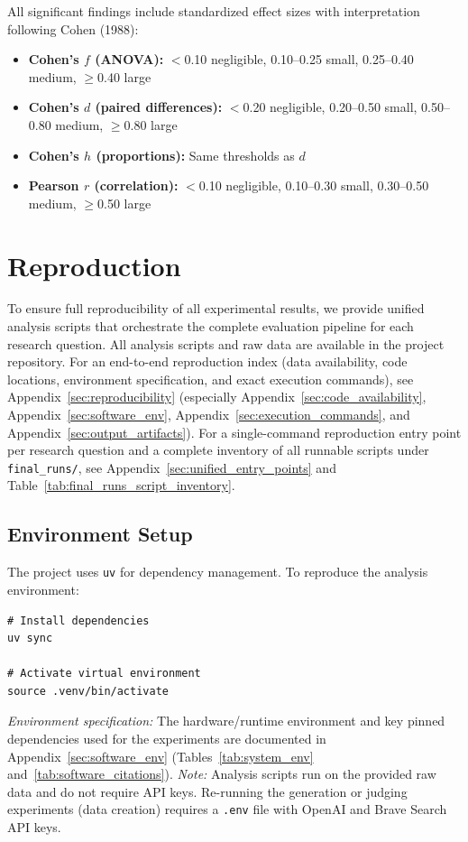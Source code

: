 All significant findings include standardized effect sizes with interpretation following Cohen (1988):
\begin{itemize}[noitemsep]
    \item \textbf{Cohen's $f$ (ANOVA):} $<$0.10 negligible, 0.10--0.25 small, 0.25--0.40 medium, $\geq$0.40 large
    \item \textbf{Cohen's $d$ (paired differences):} $<$0.20 negligible, 0.20--0.50 small, 0.50--0.80 medium, $\geq$0.80 large
    \item \textbf{Cohen's $h$ (proportions):} Same thresholds as $d$
    \item \textbf{Pearson $r$ (correlation):} $<$0.10 negligible, 0.10--0.30 small, 0.30--0.50 medium, $\geq$0.50 large
\end{itemize}

\section{Reproduction}
\label{sec:reproduction}

To ensure full reproducibility of all experimental results, we provide unified analysis scripts that orchestrate the complete evaluation pipeline for each research question. All analysis scripts and raw data are available in the project repository.
For an end-to-end reproduction index (data availability, code locations, environment specification, and exact execution commands), see Appendix~\ref{sec:reproducibility} (especially Appendix~\ref{sec:code_availability}, Appendix~\ref{sec:software_env}, Appendix~\ref{sec:execution_commands}, and Appendix~\ref{sec:output_artifacts}).
For a single-command reproduction entry point per research question and a complete inventory of all runnable scripts under \texttt{final\_runs/}, see Appendix~\ref{sec:unified_entry_points} and Table~\ref{tab:final_runs_script_inventory}.

\subsection{Environment Setup}
The project uses \texttt{uv} for dependency management. To reproduce the analysis environment:
\begin{verbatim}
# Install dependencies
uv sync

# Activate virtual environment
source .venv/bin/activate
\end{verbatim}
\textit{Environment specification:} The hardware/runtime environment and key pinned dependencies used for the experiments are documented in Appendix~\ref{sec:software_env} (Tables~\ref{tab:system_env} and~\ref{tab:software_citations}).
\textit{Note:} Analysis scripts run on the provided raw data and do not require API keys. Re-running the generation or judging experiments (data creation) requires a \texttt{.env} file with OpenAI and Brave Search API keys.

